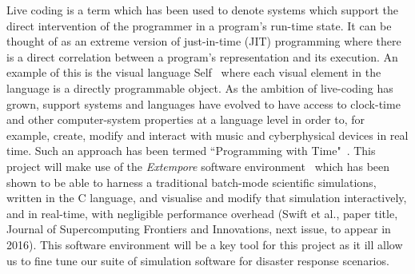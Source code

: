 \documentclass[a4paper,fontsize=12pt]{scrartcl}
\begin{document}
Live coding is a term which has been used to denote
systems which support the direct intervention of the programmer in a
program's run-time state. It can be thought of as an extreme version of
just-in-time (JIT) programming where there is a direct correlation
between a program's representation and its execution. An example of
this is the visual language Self~\parencite{ungar_self_1987} where
each visual element in the language is a directly programmable object.
As the ambition of live-coding has grown, support systems and languages
 have evolved to have access to clock-time and other
computer-system properties at a language level in order to, for
example, create, modify and interact with music and cyberphysical devices
in real time. 
Such an approach has been 
termed ``Programming with Time"~\parencite{sorensen2010programming}. This project will make use of the {\it Extempore} software environment~\parencite{sorensen_extempore} which has been shown to be able to harness  a traditional batch-mode scientific simulations, written in the C language, and visualise and modify that simulation interactively, and in real-time, with negligible performance overhead (Swift et al., paper title, Journal of Supercomputing Frontiers and Innovations, next issue, to appear in 2016). This software environment will be a key tool for this project as it ill allow us to fine tune our suite of simulation software for disaster response scenarios.\\



\\



\end{document}
